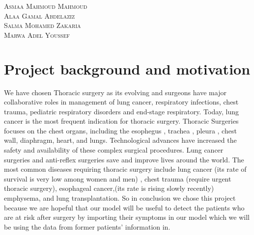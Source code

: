 \documentclass[a4paper, 11pt, oneside]{article} %
\begin{document}
\begin{titlepage}
	\vspace{0.5\baselineskip} %
  
	
	{\scshape\Large Asmaa Mahmoud Mahmoud\\ Alaa Gamal Abdelaziz\\Salma Mohamed Zakaria\\Marwa Adel Youssef\\} %
	
	
	
	\vfill %
	
	

	
	\vspace{0.3\baselineskip} %
	
	
	

\end{titlepage}

\section{Project background and motivation}

We have chosen Thoracic surgery as its evolving and surgeons have major collaborative roles in management of lung cancer, respiratory infections, chest trauma, pediatric respiratory disorders and end-stage respiratory. Today, lung cancer is the most frequent indication for thoracic surgery.
Thoracic Surgeries focuses on the chest organs, including the esophegus , trachea , pleura , chest wall, diaphragm, heart, and lungs. Technological advances have increased the safety and availability of these complex surgical procedures. Lung cancer surgeries and anti-reflex surgeries save and improve lives around the world.
The most common diseases requiring thoracic surgery include lung cancer (its rate of survival is very low among women and men) , chest trauma (require urgent thoracic surgery), esophageal cancer,(its rate is rising slowly recently) emphysema, and lung transplantation.
So in conclusion we chose this project because we are hopeful that our model will be useful to detect the patients who are at risk after surgery by importing their symptoms in our model which we will be using the data from former patients’ information in.\cite{encyclopedia} 
\newpage
\end{document}
